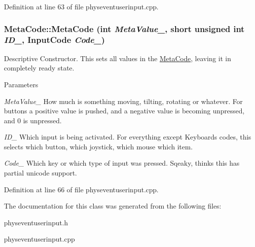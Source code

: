 Definition at line 63 of file physeventuserinput.cpp.\hypertarget{classMetaCode_a76bba215580768ab22c505ea18b2ec6d}{
\subsubsection[{MetaCode}]{\setlength{\rightskip}{0pt plus 5cm}MetaCode::MetaCode (int {\em MetaValue\_\-}, \/  short unsigned int {\em ID\_\-}, \/  InputCode {\em Code\_\-})}}
\label{d7/d72/classMetaCode_a76bba215580768ab22c505ea18b2ec6d}


Descriptive Constructor. This sets all values in the \hyperlink{classMetaCode}{MetaCode}, leaving it in completely ready state. 
\begin{DoxyParams}{Parameters}
\item[{\em MetaValue\_\-}]How much is something moving, tilting, rotating or whatever. For buttons a positive value is pushed, and a negative value is becoming unpressed, and 0 is unpressed. \item[{\em ID\_\-}]Which input is being activated. For everything except Keyboards codes, this selects which button, which joystick, which mouse which item. \item[{\em Code\_\-}]Which key or which type of input was pressed. Sqeaky, thinks this has partial unicode support. \end{DoxyParams}


Definition at line 66 of file physeventuserinput.cpp.

The documentation for this class was generated from the following files:\begin{DoxyCompactItemize}
\item 
physeventuserinput.h\item 
physeventuserinput.cpp\end{DoxyCompactItemize}
